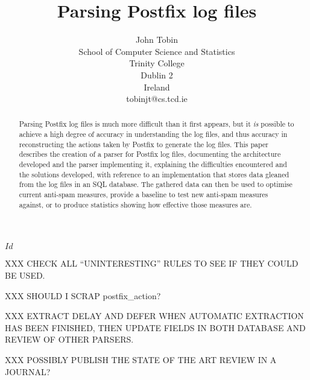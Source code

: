 \documentclass[a4paper,12pt,draft]{report}
\begin{document}
\title{Parsing Postfix log files}
\author{John Tobin \\ School of Computer Science and Statistics \\
Trinity College \\ Dublin 2 \\ Ireland \\ tobinjt@cs.tcd.ie}
\maketitle

\begin{abstract}


    Parsing Postfix log files is much more difficult than it first appears,
    but it \textit{is\/} possible to achieve a high degree of accuracy in
    understanding the log files, and thus accuracy in reconstructing the
    actions taken by Postfix to generate the log files.  This paper
    describes the creation of a parser for Postfix log files, documenting
    the architecture developed and the parser implementing it, explaining
    the difficulties encountered and the solutions developed, with
    reference to an implementation that stores data gleaned from the log
    files in an SQL database.  The gathered data can then be used to
    optimise current anti-spam measures, provide a baseline to test new
    anti-spam measures against, or to produce statistics showing how
    effective those measures are.

\end{abstract}

\SVN$Id$
\begin{center}
    \SVNId{}
\end{center}

XXX CHECK ALL ``UNINTERESTING'' RULES TO SEE IF THEY COULD BE USED\@.

XXX SHOULD I SCRAP postfix\_action?

XXX EXTRACT DELAY AND DEFER WHEN AUTOMATIC EXTRACTION HAS BEEN FINISHED,
THEN UPDATE FIELDS IN BOTH DATABASE AND REVIEW OF OTHER PARSERS\@.

XXX POSSIBLY PUBLISH THE STATE OF THE ART REVIEW IN A JOURNAL\@?

\newpage
\tableofcontents
\listoffigures
\listoftables

\newpage




\glsaddall[types={postfix}]
\end{document}
